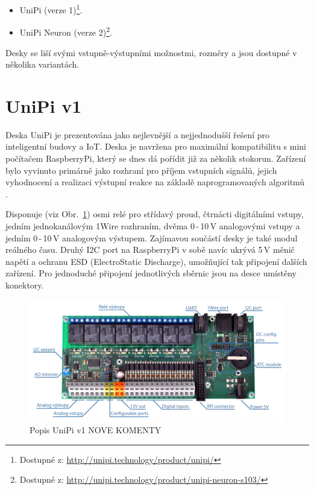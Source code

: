 \begin{itemize}
	\item UniPi (verze 1)\footnote[1]{Dostupné z: \href{http://unipi.technology/product/unipi/}{http://unipi.technology/product/unipi/}}.
	\item UniPi Neuron (verze 2)\footnote[2]{Dostupné z: \href{http://unipi.technology/product/unipi-neuron-s103/}{http://unipi.technology/product/unipi-neuron-s103/}}.
\end{itemize}

\vspace{5mm}
Desky se liší svými vstupně-výstupními možnostmi, rozměry a jsou dostupné v několika variantách.




\section{UniPi v1}
\label{KapitolaUnipi1}

Deska UniPi je prezentována jako nejlevnější a nejjednodušší řešení pro inteligentní budovy a IoT. Deska je navržena pro maximální kompatibilitu s mini počítačem RaspberryPi, který se dnes dá pořídit již za několik stokorun.  Zařízení bylo vyvinuto primárně jako rozhraní pro příjem vstupních signálů, jejich vyhodnocení a realizaci výstupní reakce na základě naprogramovaných algoritmů \cite{UniPiBoard1}.

Disponuje (viz Obr.~\ref{ObrazekUnipiV1}) osmi relé pro střídavý proud, čtrnácti digitálními vstupy, jedním jednokanálovým 1Wire rozhraním, dvěma 0\,-\,10\,V analogovými vstupy a jedním 0\,-\,10\,V analogovým výstupem. Zajímavou součástí desky je také modul reálného času. Druhý I2C port na RaspberryPi v sobě navíc ukrývá 5\,V měnič napětí a ochranu ESD (ElectroStatic Discharge), umožňující tak připojení dalších zařízení. Pro jednoduché připojení jednotlivých sběrnic jsou na desce umístěny konektory.

 \begin{figure}[!ht]
  \begin{center}
    \includegraphics[scale=0.35]{obrazky/unipi_v1}
  \end{center}
  \caption{Popis UniPi v1 \cite{UniPiBoard1} \colorbox[rgb]{1,0,0}{NOVE KOMENTY}  }
	\label{ObrazekUnipiV1}
\end{figure}

